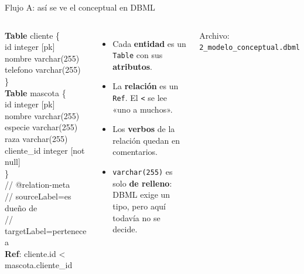 \documentclass[aspectratio=169,10pt,c]{beamer}
\newcommand{\kw}[1]{\textcolor{utpRojo}{\textbf{#1}}}
\newenvironment{sqlcode}[1][.86\textwidth]
  {\begin{center}\begin{lrbox}{\sqlbuf}\begin{minipage}{#1}\ttfamily\footnotesize\vspace{6pt}\raggedright}
  {\vspace{6pt}\end{minipage}\end{lrbox}\colorbox{utpGrisClaro}{\usebox{\sqlbuf}}\end{center}}
\newcommand{\ind}{\hspace*{1.6em}}
\newcommand{\dq}{\char34}
\newcommand{\dcom}[1]{\textcolor{utpGris}{// #1}}
\begin{document}
\begin{frame}{Flujo A: así se ve el conceptual en DBML}
\begin{columns}[c,onlytextwidth]
\begin{sqlcode}[\dimexpr\textwidth-2\fboxsep\relax]
\scriptsize
\kw{Table} cliente \{\\
\ind id integer [pk]\\
\ind nombre varchar(255)\\
\ind telefono varchar(255)\\
\}\\[4pt]
\kw{Table} mascota \{\\
\ind id integer [pk]\\
\ind nombre varchar(255)\\
\ind especie varchar(255)\\
\ind raza varchar(255)\\
\ind cliente\_id integer [not null]\\
\}\\[4pt]
\dcom{@relation-meta}\\
\dcom{sourceLabel=\dq{}es dueño de\dq}\\
\dcom{targetLabel=\dq{}pertenece a\dq}\\
\kw{Ref}: cliente.id < mascota.cliente\_id
\end{sqlcode}
\small
\begin{itemize}\setlength\itemsep{7pt}
  \item Cada \textbf{entidad} es un \texttt{Table} con sus \textbf{atributos}.
  \item La \textbf{relación} es un \texttt{Ref}. El \texttt{<} se lee «uno a muchos».
  \item Los \textbf{verbos} de la relación quedan en comentarios.
  \item \texttt{varchar(255)} es solo \textbf{de relleno}: DBML exige un tipo, pero aquí todavía no se decide.
\end{itemize}
\vspace{0.15cm}
\footnotesize\color{utpGris} Archivo: \texttt{2\_modelo\_conceptual.dbml}
\end{columns}
\end{frame}
\end{document}

